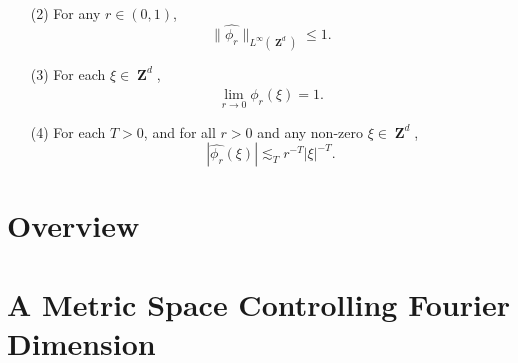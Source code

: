 \documentclass[12pt,reqno]{article}
\numberwithin{equation}{section}
\DeclareMathOperator{\ZZ}{\mathbf{Z}}
\DeclareMathOperator{\TT}{\mathbf{T}}
\numberwithin{theorem}{section}
\begin{document}
\begin{itemize}
\begin{enumerate}
    \item[(2)] For any $r \in (0,1)$,
    \begin{equation} \label{equationDIOJAOIJVIV23242}
        \| \widehat{\phi_r} \|_{L^\infty(\ZZ^d)} \leq 1.
    \end{equation}


    \item[(3)] For each $\xi \in \ZZ^d$,
    \begin{equation} \label{approximationtoidentitypointwiseconvergence}
        \lim_{r \to 0} \widehat{\phi_r}(\xi) = 1.
    \end{equation}

    \item[(4)] For each $T > 0$, and for all $r > 0$ and any non-zero $\xi \in \ZZ^d$,
    \begin{equation} \label{molificationdecaybound}
        |\widehat{\phi_r}(\xi)| \lesssim_T r^{-T} |\xi|^{-T}.
    \end{equation}
\end{enumerate}
\end{itemize}

\section{Overview}

\section{A Metric Space Controlling Fourier Dimension}
\end{document}
